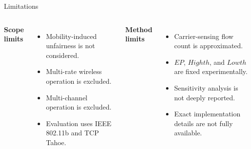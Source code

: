 \begin{frame}{Limitations}

\begin{columns}[T,onlytextwidth]
\textbf{Scope limits}
\begin{itemize}
    \item Mobility-induced unfairness is not considered.
    \item Multi-rate wireless operation is excluded.
    \item Multi-channel operation is excluded.
    \item Evaluation uses IEEE 802.11b and TCP Tahoe.
\end{itemize}

\textbf{Method limits}
\begin{itemize}
    \item Carrier-sensing flow count is approximated.
    \item $EP$, $Highth$, and $Lowth$ are fixed experimentally.
    \item Sensitivity analysis is not deeply reported.
    \item Exact implementation details are not fully available.
\end{itemize}
\end{columns}
\end{frame}
